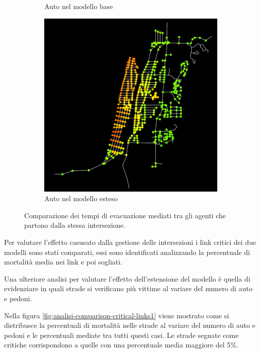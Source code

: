 \begin{figure}[ht]
\begin{subfigure}{0.475\textwidth}
        \caption{Auto nel modello base}
        \label{fig:2d-evtimes-base-car}
    \end{subfigure}
    \hfill
    \begin{subfigure}{0.475\textwidth}
        \centering
        \includegraphics[width=\textwidth]{images/analisi/comparison-ev-times-map-new-car.png}
        \caption{Auto nel modello esteso}
        \label{fig:2d-evtimes-new-car}
    \end{subfigure}
    \caption{Comparazione dei tempi di evacuazione mediati tra gli agenti che partono dalla stessa intersezione. }
    \label{fig:analisi-comparison-ev-times-map}
\end{figure}

Per valutare l'effetto casusato dalla gestione delle intersezioni i link critici dei due modelli sono stati comparati,
essi sono identificati analizzando la percentuale di mortalità media nei link e poi sogliati.

Una ulteriore analisi per valutare l'effetto dell'estensione del modello è quella di evidenziare in quali strade si verificano 
più vittime al variare del numero di auto e pedoni. 

Nella figura \ref{fig:analisi-comparison-critical-links1} viene mostrato come si distribusce la percentuali di mortalità nelle strade 
al variare del numero di auto e pedoni e le percentuali mediate tra tutti questi casi. 
Le strade segnate come critiche corrispondono a quelle con una percentuale media maggiore del 5\%.

